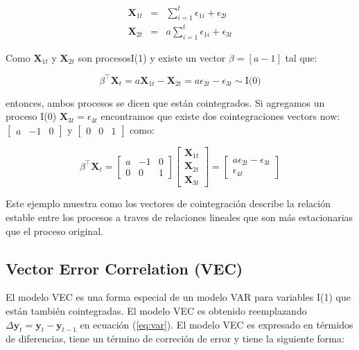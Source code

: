 \begin{eqnarray*}
\mathbf{X}_{1t} &=& \sum_{i=1}^t \epsilon_{1i} + \epsilon_{2t} \\
\mathbf{X}_{2t} &=& a \sum_{i=1}^t \epsilon_{1i} + \epsilon_{3t} 
\end{eqnarray*}

Como $\mathbf{X}_{1t}$ y $\mathbf{X}_{2t}$ son procesosI(1) y existe un vector
$\beta = [a -1]$ tal que:

\[
\beta^\intercal \mathbf{X}_t = a \mathbf{X}_{1t} -\mathbf{X}_{2t} = 
a\epsilon_{2t} - \epsilon_{3t} \sim \text{I(0)}
\]

entonces, ambos procesos se dicen que están cointegrados. Si agregamos un proceso I(0)
$\mathbf{X}_{3t} = \epsilon_{4t}$ encontramos que existe dos cointegraciones
vectors now: $\begin{bmatrix}a &-1& 0\end{bmatrix}$ y $\begin{bmatrix}0
&0&1\end{bmatrix}$ como:

\[
\beta^\intercal \mathbf{X}_t = 
\begin{bmatrix}
a & -1 & 0 \\
0 & 0 & 1
\end{bmatrix} 
\begin{bmatrix} 
\mathbf{X}_{1t} \\
\mathbf{X}_{2t} \\
\mathbf{X}_{3t}
\end{bmatrix} = 
\begin{bmatrix}
a\epsilon_{2t} - \epsilon_{3t} \\
\epsilon_{4t}
\end{bmatrix}
\]

Este ejemplo muestra como los vectores de cointegración describe la relación
estable entre los procesos a traves de relaciones lineales que son más
estacionarias que el proceso original.

\subsection{Vector Error Correlation (VEC)}

El modelo VEC es una forma especial de un modelo VAR para variables I(1) que
están también cointegradas. El modelo VEC es obtenido reemplazando
$\Delta \mathbf{y}_t = \mathbf{y}_t - \mathbf{y}_{t-1}$ en ecuación
(\ref{eq:var}). El modelo VEC es expresado en térmidos de diferencias,
tiene un término de correción de error y tiene la siguiente forma:

